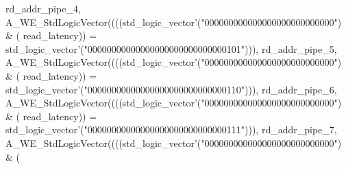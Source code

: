 \begin{DoxyCode}
{      rd_addr_pipe_4}\textcolor{vhdlchar}{,} \textcolor{vhdlchar}{A\_WE\_StdLogicVector}\textcolor{vhdlchar}{(}\textcolor{vhdlchar}{(}\textcolor{vhdlchar}{(}\textcolor{vhdlchar}{(}\textcolor{comment}{std\_logic\_vector}\textcolor{vhdlchar}{'}\textcolor{vhdlchar}{(}\textcolor{vhdllogic}{"000000000000000000000000000"}\textcolor{vhdlchar}{)} \textcolor{vhdlchar}{&} \textcolor{vhdlchar}{(}\textcolor{vhdlchar}{
      read_latency}\textcolor{vhdlchar}{)}\textcolor{vhdlchar}{)} \textcolor{vhdlchar}{=} \textcolor{comment}{std\_logic\_vector}\textcolor{vhdlchar}{'}\textcolor{vhdlchar}{(}\textcolor{vhdllogic}{"00000000000000000000000000000101"}\textcolor{vhdlchar}{)}\textcolor{vhdlchar}{)}\textcolor{vhdlchar}{)}\textcolor{vhdlchar}{,} \textcolor{vhdlchar}{
      rd_addr_pipe_5}\textcolor{vhdlchar}{,} \textcolor{vhdlchar}{A\_WE\_StdLogicVector}\textcolor{vhdlchar}{(}\textcolor{vhdlchar}{(}\textcolor{vhdlchar}{(}\textcolor{vhdlchar}{(}\textcolor{comment}{std\_logic\_vector}\textcolor{vhdlchar}{'}\textcolor{vhdlchar}{(}\textcolor{vhdllogic}{"000000000000000000000000000"}\textcolor{vhdlchar}{)} \textcolor{vhdlchar}{&} \textcolor{vhdlchar}{(}\textcolor{vhdlchar}{
      read_latency}\textcolor{vhdlchar}{)}\textcolor{vhdlchar}{)} \textcolor{vhdlchar}{=} \textcolor{comment}{std\_logic\_vector}\textcolor{vhdlchar}{'}\textcolor{vhdlchar}{(}\textcolor{vhdllogic}{"00000000000000000000000000000110"}\textcolor{vhdlchar}{)}\textcolor{vhdlchar}{)}\textcolor{vhdlchar}{)}\textcolor{vhdlchar}{,} \textcolor{vhdlchar}{
      rd_addr_pipe_6}\textcolor{vhdlchar}{,} \textcolor{vhdlchar}{A\_WE\_StdLogicVector}\textcolor{vhdlchar}{(}\textcolor{vhdlchar}{(}\textcolor{vhdlchar}{(}\textcolor{vhdlchar}{(}\textcolor{comment}{std\_logic\_vector}\textcolor{vhdlchar}{'}\textcolor{vhdlchar}{(}\textcolor{vhdllogic}{"000000000000000000000000000"}\textcolor{vhdlchar}{)} \textcolor{vhdlchar}{&} \textcolor{vhdlchar}{(}\textcolor{vhdlchar}{
      read_latency}\textcolor{vhdlchar}{)}\textcolor{vhdlchar}{)} \textcolor{vhdlchar}{=} \textcolor{comment}{std\_logic\_vector}\textcolor{vhdlchar}{'}\textcolor{vhdlchar}{(}\textcolor{vhdllogic}{"00000000000000000000000000000111"}\textcolor{vhdlchar}{)}\textcolor{vhdlchar}{)}\textcolor{vhdlchar}{)}\textcolor{vhdlchar}{,} \textcolor{vhdlchar}{
      rd_addr_pipe_7}\textcolor{vhdlchar}{,} \textcolor{vhdlchar}{A\_WE\_StdLogicVector}\textcolor{vhdlchar}{(}\textcolor{vhdlchar}{(}\textcolor{vhdlchar}{(}\textcolor{vhdlchar}{(}\textcolor{comment}{std\_logic\_vector}\textcolor{vhdlchar}{'}\textcolor{vhdlchar}{(}\textcolor{vhdllogic}{"000000000000000000000000000"}\textcolor{vhdlchar}{)} \textcolor{vhdlchar}{&} \textcolor{vhdlchar}{(}\textcolor{vhdlchar}{
}
\end{DoxyCode}
